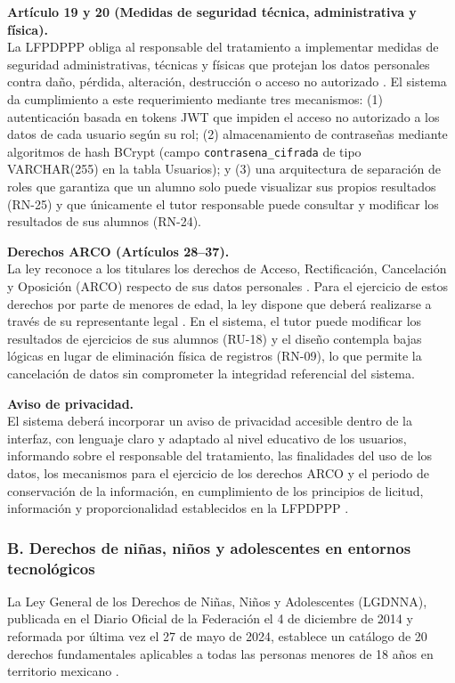 \textbf{Artículo 19 y 20 (Medidas de seguridad técnica, administrativa y física).} \\
La LFPDPPP obliga al responsable del tratamiento a implementar medidas de seguridad administrativas, técnicas y físicas que protejan los datos personales contra daño, pérdida, alteración, destrucción o acceso no autorizado \cite{lfpdppp2025}. El sistema da cumplimiento a este requerimiento mediante tres mecanismos: (1) autenticación basada en tokens JWT que impiden el acceso no autorizado a los datos de cada usuario según su rol; (2) almacenamiento de contraseñas mediante algoritmos de hash BCrypt (campo \texttt{contrasena\_cifrada} de tipo VARCHAR(255) en la tabla Usuarios); y (3) una arquitectura de separación de roles que garantiza que un alumno solo puede visualizar sus propios resultados (RN-25) y que únicamente el tutor responsable puede consultar y modificar los resultados de sus alumnos (RN-24).

\textbf{Derechos ARCO (Artículos 28--37).} \\
La ley reconoce a los titulares los derechos de Acceso, Rectificación, Cancelación y Oposición (ARCO) respecto de sus datos personales \cite{lfpdppp2025}. Para el ejercicio de estos derechos por parte de menores de edad, la ley dispone que deberá realizarse a través de su representante legal \cite{lfpdppp2025}. En el sistema, el tutor puede modificar los resultados de ejercicios de sus alumnos (RU-18) y el diseño contempla bajas lógicas en lugar de eliminación física de registros (RN-09), lo que permite la cancelación de datos sin comprometer la integridad referencial del sistema.

\textbf{Aviso de privacidad.} \\
El sistema deberá incorporar un aviso de privacidad accesible dentro de la interfaz, con lenguaje claro y adaptado al nivel educativo de los usuarios, informando sobre el responsable del tratamiento, las finalidades del uso de los datos, los mecanismos para el ejercicio de los derechos ARCO y el periodo de conservación de la información, en cumplimiento de los principios de licitud, información y proporcionalidad establecidos en la LFPDPPP \cite{lfpdppp2025}.

\subsubsection*{B. Derechos de niñas, niños y adolescentes en entornos tecnológicos}
La Ley General de los Derechos de Niñas, Niños y Adolescentes (LGDNNA), publicada en el Diario Oficial de la Federación el 4 de diciembre de 2014 y reformada por última vez el 27 de mayo de 2024, establece un catálogo de 20 derechos fundamentales aplicables a todas las personas menores de 18 años en territorio mexicano \cite{lgdnna2024}.

